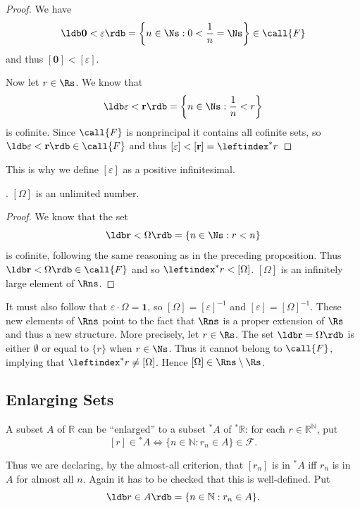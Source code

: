 \begin{proof}
    We have
    $$
    \ldb \textbf{0} < \varepsilon \rdb = \left\{ n \in \Ns : 0 <\frac{1}{n} = \Ns  \right\}\in \call{F}
    $$
    and thus $[\textbf{0}] < [\varepsilon]$.

    Now let $r \in \Rs$. We know that
    $$
    \ldb \varepsilon <\textbf{r} \rdb = \left\{ n\in \Ns : \frac{1}{n} < r \right\}
    $$
    is cofinite. Since $\call{F}$ is nonprincipal it contains all cofinite sets, so $\ldb \varepsilon <\textbf{r} \rdb \in \call{F}$ and thus $[\varepsilon] <[\textbf{r}]=\leftindex^* r$
\end{proof}
This is why we define $[\varepsilon]$ as a positive infinitesimal. 

. $[\Omega]$ is an unlimited number.


\begin{proof}
    We know that the set 
    $$
    \ldb \textbf{r} < \Omega \rdb = \left\{ n \in \Ns : r < n \right\}
    $$
    is cofinite, following the same reasoning as in the preceding proposition. Thus $\ldb \textbf{r} < \Omega \rdb \in \call{F}$ and so $\leftindex^* r <[\Omega]$. $[\Omega]$ is an infinitely large element of $\Rns$.
\end{proof}

It must also follow that $\varepsilon \cdot \Omega =\textbf{1}$, so $[\Omega]=[\varepsilon]^{-1}$ and $[\varepsilon]=[\Omega]^{-1}$. These new elements of $\Rns$ point to the fact that $\Rns$ is a proper extension of $\Rs$ and thus a new structure. More precisely, let $r \in \Rs$. The set $\ldb \textbf{r} =\Omega \rdb$ is either $\emptyset$ or equal to $\{r\}$ when $r \in \Ns$. Thus it cannot belong to $\call{F}$, implying that $\leftindex^* r \neq [\Omega]$. Hence $[\Omega] \in \Rns \setminus \Rs$.

\subsection{Enlarging Sets}
A subset $A$ of $\mathbb{R}$ can be ``enlarged'' to a subset ${}^*A$ of ${}^*\mathbb{R}$: for each $r \in \mathbb{R}^{\mathbb{N}}$, put
\[
[ r] \in {}^*A \iff \{n \in \mathbb{N} : r_n \in A\} \in \mathcal{F}.
\]

Thus we are declaring, by the almost-all criterion, that $[r_n]$ is in ${}^*A$ iff $r_n$ is in $A$ for almost all $n$. Again it has to be checked that this is well-defined. Put
\[
\ldb r \in A\rdb = \{n \in \mathbb{N} : r_n \in A\}.
\]

